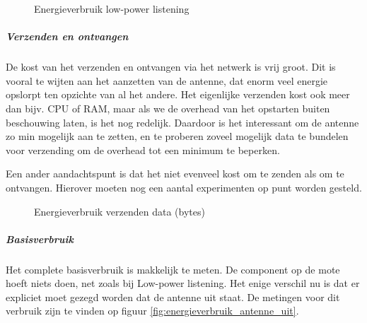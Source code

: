 \documentclass[11pt]{article}
\begin{document}
\begin{figure}[h]
\centering

\caption{Energieverbruik low-power listening}
\label{fig:energieverbruik_lpl}
\end{figure}


\subparagraph{Verzenden en ontvangen}

De kost van het verzenden en ontvangen via het netwerk is vrij groot. Dit is
vooral te wijten aan het aanzetten van de antenne, dat enorm veel energie
opslorpt ten opzichte van al het andere. Het eigenlijke verzenden kost ook meer
dan bijv. CPU of RAM, maar als we de overhead van het opstarten buiten
beschouwing laten, is het nog redelijk. Daardoor is het interessant om de
antenne zo min mogelijk aan te zetten, en te proberen zoveel mogelijk data te
bundelen voor verzending om de overhead tot een minimum te beperken.

Een ander aandachtspunt is dat het niet evenveel kost om te zenden als om te
ontvangen. Hierover moeten nog een aantal experimenten op punt worden gesteld.

\begin{figure}[h]
\centering

\caption{Energieverbruik verzenden data (bytes)}
\label{fig:energieverbruik_ant}
\end{figure}

\subparagraph{Basisverbruik}

Het complete basisverbruik is makkelijk te meten. De component op de mote hoeft
niets doen, net zoals bij Low-power listening. Het enige verschil nu is dat er
expliciet moet gezegd worden dat de antenne uit staat.
De metingen voor dit verbruik zijn te vinden op figuur \ref{fig:energieverbruik_antenne_uit}.
\end{document}
